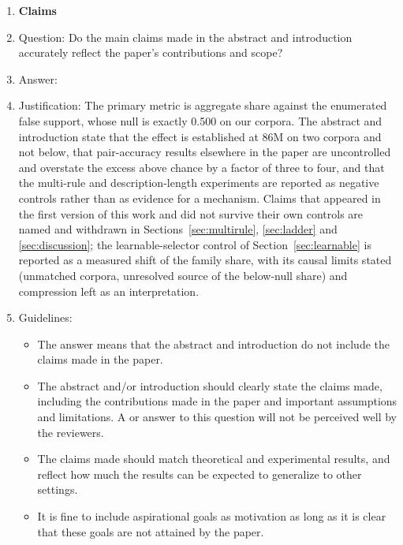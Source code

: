\documentclass{article}
\begin{document}
\begin{enumerate}

\item {\bf Claims}
    \item[] Question: Do the main claims made in the abstract and introduction accurately reflect the paper's contributions and scope?
    \item[] Answer: \answerYes{}
    \item[] Justification: The primary metric is aggregate share against the enumerated false support, whose null is exactly 0.500 on our corpora. The abstract and introduction state that the effect is established at 86M on two corpora and not below, that pair-accuracy results elsewhere in the paper are uncontrolled and overstate the excess above chance by a factor of three to four, and that the multi-rule and description-length experiments are reported as negative controls rather than as evidence for a mechanism. Claims that appeared in the first version of this work and did not survive their own controls are named and withdrawn in Sections~\ref{sec:multirule}, \ref{sec:ladder} and \ref{sec:discussion}; the learnable-selector control of Section~\ref{sec:learnable} is reported as a measured shift of the family share, with its causal limits stated (unmatched corpora, unresolved source of the below-null share) and compression left as an interpretation.
    \item[] Guidelines:
    \begin{itemize}
        \item The answer \answerNA{} means that the abstract and introduction do not include the claims made in the paper.
        \item The abstract and/or introduction should clearly state the claims made, including the contributions made in the paper and important assumptions and limitations. A \answerNo{} or \answerNA{} answer to this question will not be perceived well by the reviewers.
        \item The claims made should match theoretical and experimental results, and reflect how much the results can be expected to generalize to other settings.
        \item It is fine to include aspirational goals as motivation as long as it is clear that these goals are not attained by the paper.
    \end{itemize}


\end{enumerate}
\end{document}
